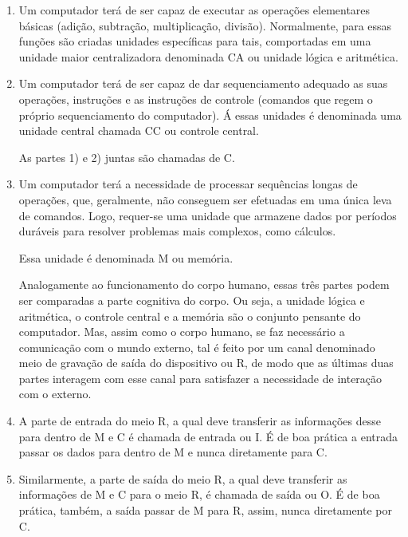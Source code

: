 \documentclass{article}
\begin{document}
\begin{enumerate}
    \item Um computador terá de ser capaz de executar as operações elementares
        básicas (adição, subtração, multiplicação, divisão). Normalmente, para
        essas funções são criadas unidades específicas para tais, comportadas em
        uma unidade maior centralizadora denominada CA ou unidade lógica e
        aritmética.

    \item Um computador terá de ser capaz de dar sequenciamento adequado as suas
        operações, instruções e as instruções de controle (comandos que regem o
        próprio sequenciamento do computador). Á essas unidades é denominada uma
        unidade central chamada CC ou controle central.

        As partes 1) e 2) juntas são chamadas de C. 

    \item Um computador terá a necessidade de processar sequências longas de
        operações, que, geralmente, não conseguem ser efetuadas em uma única
        leva de comandos. Logo, requer-se uma unidade que armazene dados por
        períodos duráveis para resolver problemas mais complexos, como cálculos.

        Essa unidade é denominada M ou memória.

        Analogamente ao funcionamento do corpo humano, essas três partes podem
        ser comparadas a parte cognitiva do corpo. Ou seja, a unidade lógica e
        aritmética, o controle central e a memória são o conjunto pensante do
        computador. Mas, assim como o corpo humano, se faz necessário a
        comunicação com o mundo externo, tal é feito por um canal denominado
        meio de gravação de saída do dispositivo ou R, de modo que as últimas
        duas partes interagem com esse canal para satisfazer a necessidade de
        interação com o externo. 

    \item A parte de entrada do meio R, a qual deve transferir as informações
        desse para dentro de M e C é chamada de entrada ou I. É de boa prática a
        entrada passar os dados para dentro de M e nunca diretamente para C. 

    \item Similarmente, a parte de saída do meio R, a qual deve transferir as
        informações de M e C para o meio R, é chamada de saída ou O. É de boa
        prática, também, a saída passar de M para R, assim, nunca diretamente
        por C. 
\end{enumerate}
\end{document}
